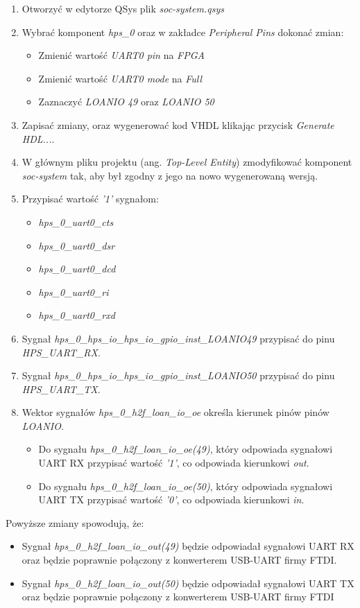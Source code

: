\begin{enumerate}
\item Otworzyć w edytorze QSys plik \textit{soc-system.qsys}
\item Wybrać komponent \textit{hps\_0} oraz w zakładce \textit{Peripheral Pins} dokonać zmian:
	\begin{itemize}[noitemsep,nolistsep]
	\item Zmienić wartość \textit{UART0 pin} na \textit{FPGA}
	\item Zmienić wartość \textit{UART0 mode} na \textit{Full}
	\item Zaznaczyć \textit{LOANIO 49} oraz \textit{LOANIO 50}
	\end{itemize}
\item Zapisać zmiany, oraz wygenerować kod VHDL klikając przycisk \textit{Generate HDL...}.
\item W głównym pliku projektu (ang. \textit{Top-Level Entity}) zmodyfikować komponent \textit{soc-system} tak, aby był zgodny z jego na nowo wygenerowaną wersją.
\item Przypisać wartość \textit{'1'} sygnałom:
	\begin{itemize}[noitemsep,nolistsep]
	\item \textit{hps\_0\_uart0\_cts}
	\item \textit{hps\_0\_uart0\_dsr}
	\item \textit{hps\_0\_uart0\_dcd}
	\item \textit{hps\_0\_uart0\_ri}
	\item \textit{hps\_0\_uart0\_rxd}
	\end{itemize}
\item Sygnał \textit{hps\_0\_hps\_io\_hps\_io\_gpio\_inst\_LOANIO49} przypisać do pinu \textit{HPS\_UART\_RX}.
\item Sygnał \textit{hps\_0\_hps\_io\_hps\_io\_gpio\_inst\_LOANIO50} przypisać do pinu \textit{HPS\_UART\_TX}.
\item Wektor sygnałów \textit{hps\_0\_h2f\_loan\_io\_oe} określa kierunek pinów pinów \textit{LOANIO}.
	\begin{itemize}[noitemsep,nolistsep]
	\item Do sygnału \textit{hps\_0\_h2f\_loan\_io\_oe(49)}, który odpowiada sygnałowi UART RX przypisać wartość \textit{'1'}, co odpowiada kierunkowi \textit{out}.
	\item Do sygnału \textit{hps\_0\_h2f\_loan\_io\_oe(50)}, który odpowiada sygnałowi UART TX przypisać wartość \textit{'0'}, co odpowiada kierunkowi \textit{in}.
	\end{itemize}
\end{enumerate}
Powyższe zmiany spowodują, że:
\begin{itemize}[noitemsep]
\item Sygnał \textit{hps\_0\_h2f\_loan\_io\_out(49)} będzie odpowiadał sygnałowi UART RX oraz będzie poprawnie połączony z konwerterem USB-UART firmy FTDI.
\item Sygnał \textit{hps\_0\_h2f\_loan\_io\_out(50)} będzie odpowiadał sygnałowi UART TX oraz będzie poprawnie połączony z konwerterem USB-UART firmy FTDI
\end{itemize}

